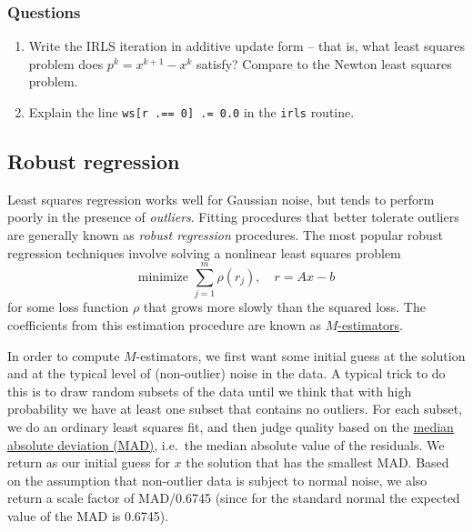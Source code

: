 \documentclass[12pt, leqno]{article} %
\providecommand{\tightlist}{%
  \setlength{\itemsep}{0pt}\setlength{\parskip}{0pt}}
\begin{document}
\subsubsection{Questions}

\begin{enumerate}
\def\labelenumi{\arabic{enumi}.}
\tightlist
\item
  Write the IRLS iteration in additive update form -- that is, what
  least squares problem does \(p^k = x^{k+1}-x^k\) satisfy? Compare to
  the Newton least squares problem.
\item
  Explain the line \texttt{ws{[}r\ .==\ 0{]}\ .=\ 0.0} in the
  \texttt{irls} routine.
\end{enumerate}

\subsection{Robust regression}

Least squares regression works well for Gaussian noise, but tends to
perform poorly in the presence of \emph{outliers}. Fitting procedures
that better tolerate outliers are generally known as \emph{robust
regression} procedures. The most popular robust regression techniques
involve solving a nonlinear least squares problem
\[\mbox{minimize } \sum_{j=1}^m \rho(r_j), \quad r = Ax-b\] for some
loss function \(\rho\) that grows more slowly than the squared loss. The
coefficients from this estimation procedure are known as
\href{https://en.wikipedia.org/wiki/M-estimator}{\(M\)-estimators}.

In order to compute \(M\)-estimators, we first want some initial guess
at the solution and at the typical level of (non-outlier) noise in the
data. A typical trick to do this is to draw random subsets of the data
until we think that with high probability we have at least one subset
that contains no outliers. For each subset, we do an ordinary least
squares fit, and then judge quality based on the
\href{https://en.wikipedia.org/wiki/Median_absolute_deviation}{median
absolute deviation (MAD)}, i.e.~the median absolute value of the
residuals. We return as our initial guess for \(x\) the solution that
has the smallest MAD. Based on the assumption that non-outlier data is
subject to normal noise, we also return a scale factor of MAD/0.6745
(since for the standard normal the expected value of the MAD is 0.6745).
\end{document}
